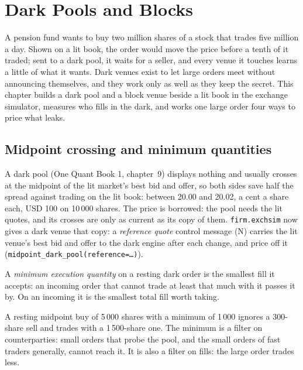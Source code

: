 \chapter{Dark Pools and Blocks}\label{ch:mx:dark-pools-and-blocks}

A pension fund wants to buy two million shares of a stock that trades five million a day. Shown on a lit book, the order would move the price before a
tenth of it traded; sent to a dark pool, it waits for a seller, and every venue it touches learns a little of what it wants. Dark venues exist to let
large orders meet without announcing themselves, and they work only as well as they keep the secret. This chapter builds a dark pool and a block
venue beside a lit book in the exchange simulator, measures who fills in the dark, and works one large order four ways to price what leaks.

\section{Midpoint crossing and minimum quantities}

A dark pool (One Quant Book 1, chapter~9) displays nothing and usually crosses at the midpoint of the lit market's best bid and offer, so both sides
save half the spread against trading on the lit book: between 20.00 and 20.02, a cent a share each, USD 100 on 10\,000 shares. The price is borrowed:
the pool needs the lit quotes, and its crosses are only as current as its copy of them. \texttt{firm.exchsim} now gives a dark venue that copy: a
\emph{reference quote} control message (N) carries the lit venue's best bid and offer to the dark engine after each change, and  price off
it (\texttt{midpoint\_dark\_pool(reference=\dots)}).

\begin{definition}\label{def:mx:dark-pools-and-blocks:minqty}
A \emph{minimum execution quantity} on a resting dark order is the smallest fill it accepts: an incoming order that
cannot trade at least that much with it passes it by. On an incoming  it is the smallest total fill worth taking.
\end{definition}

A resting midpoint buy of 5\,000 shares with a minimum of 1\,000 ignores a 300-share sell and trades with a 1\,500-share one. The minimum is a filter on
counterparties: small orders that probe the pool, and the small orders of fast traders generally, cannot reach it. It is also a filter on fills: the
large order trades less.

